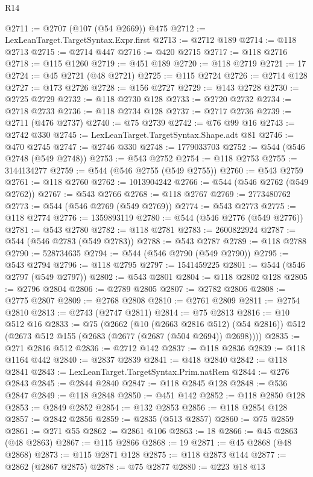 \begin{lexlean}{R14}
\begin{coremodule}
{{{{{{{{{{{{{{{{{{{{{{{{{{{{{{{{{{{{{{{{{{{{{{{{{{{{{{{{{{{{{{{{{{{{{{{{{{{{{{{{{{@2711 := @2707 (@107 (@54 @2669)) @475
@2712 := LexLeanTarget.TargetSyntax.Expr.first
@2713 := @2712 @189
@2714 := @118 @2713
@2715 := @2714 @447
@2716 := @420 @2715
@2717 := @118 @2716
@2718 := @115 @1260
@2719 := @451 @189
@2720 := @118 @2719
@2721 := 17
@2724 := @45 @2721 (@48 @2721)
@2725 := @115 @2724
@2726 := @2714 @128
@2727 := @173 @2726
@2728 := @156 @2727
@2729 := @143 @2728
@2730 := @2725 @2729
@2732 := @118 @2730 @128
@2733 := @2720 @2732
@2734 := @2718 @2733
@2736 := @118 @2734 @128
@2737 := @2717 @2736
@2739 := @2711 (@476 @2737)
@2740 := @75 @2739
@2742 := @76 @99 @16
@2743 := @2742 @330
@2745 := LexLeanTarget.TargetSyntax.Shape.adt @81
@2746 := @470 @2745
@2747 := @2746 @330
@2748 := 1779033703
@2752 := @544 (@546 @2748 (@549 @2748))
@2753 := @543 @2752
@2754 := @118 @2753
@2755 := 3144134277
@2759 := @544 (@546 @2755 (@549 @2755))
@2760 := @543 @2759
@2761 := @118 @2760
@2762 := 1013904242
@2766 := @544 (@546 @2762 (@549 @2762))
@2767 := @543 @2766
@2768 := @118 @2767
@2769 := 2773480762
@2773 := @544 (@546 @2769 (@549 @2769))
@2774 := @543 @2773
@2775 := @118 @2774
@2776 := 1359893119
@2780 := @544 (@546 @2776 (@549 @2776))
@2781 := @543 @2780
@2782 := @118 @2781
@2783 := 2600822924
@2787 := @544 (@546 @2783 (@549 @2783))
@2788 := @543 @2787
@2789 := @118 @2788
@2790 := 528734635
@2794 := @544 (@546 @2790 (@549 @2790))
@2795 := @543 @2794
@2796 := @118 @2795
@2797 := 1541459225
@2801 := @544 (@546 @2797 (@549 @2797))
@2802 := @543 @2801
@2804 := @118 @2802 @128
@2805 := @2796 @2804
@2806 := @2789 @2805
@2807 := @2782 @2806
@2808 := @2775 @2807
@2809 := @2768 @2808
@2810 := @2761 @2809
@2811 := @2754 @2810
@2813 := @2743 (@2747 @2811)
@2814 := @75 @2813
@2816 := @10 @512 @16
@2833 := @75
    (@2662
      (@10 (@2663 @2816 @512) (@54 @2816))
      @512
      (@2673 @512 @155 (@2683 (@2677 (@2687 (@504 @2694)) @2698))))
@2835 := @271 @2816 @512
@2836 := @2712 @142
@2837 := @118 @2836
@2839 := @118 @1164 @442
@2840 := @2837 @2839
@2841 := @418 @2840
@2842 := @118 @2841
@2843 := LexLeanTarget.TargetSyntax.Prim.natRem
@2844 := @276 @2843
@2845 := @2844 @2840
@2847 := @118 @2845 @128
@2848 := @536 @2847
@2849 := @118 @2848
@2850 := @451 @142
@2852 := @118 @2850 @128
@2853 := @2849 @2852
@2854 := @132 @2853
@2856 := @118 @2854 @128
@2857 := @2842 @2856
@2859 := @2835 (@513 @2857)
@2860 := @75 @2859
@2861 := @271 @55
@2862 := @2861 @106
@2863 := 18
@2866 := @45 @2863 (@48 @2863)
@2867 := @115 @2866
@2868 := 19
@2871 := @45 @2868 (@48 @2868)
@2873 := @115 @2871 @128
@2875 := @118 @2873 @144
@2877 := @2862 (@2867 @2875)
@2878 := @75 @2877
@2880 := @223 @18 @13
}}}}}}}}}}}}}}}}}}}}}}}}}}}}}}}}}}}}}}}}}}}}}}}}}}}}}}}}}}}}}}}}}}}}}}}}}}}}}}}}}}
\end{coremodule}
\end{lexlean}
